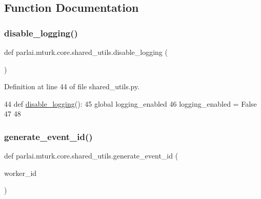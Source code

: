 \subsection{Function Documentation}
\mbox{\label{namespaceparlai_1_1mturk_1_1core_1_1shared__utils_ac9c2cb4e45eb5bb480df0cd8b18c64da}} 
\subsubsection{\texorpdfstring{disable\+\_\+logging()}{disable\_logging()}}
{\footnotesize\ttfamily def parlai.\+mturk.\+core.\+shared\+\_\+utils.\+disable\+\_\+logging (\begin{DoxyParamCaption}{ }\end{DoxyParamCaption})}



Definition at line 44 of file shared\+\_\+utils.\+py.


\begin{DoxyCode}
44 \textcolor{keyword}{def }\hyperlink{namespaceparlai_1_1mturk_1_1core_1_1shared__utils_ac9c2cb4e45eb5bb480df0cd8b18c64da}{disable\_logging}():
45     \textcolor{keyword}{global} logging\_enabled
46     logging\_enabled = \textcolor{keyword}{False}
47 
48 
\end{DoxyCode}
\mbox{\label{namespaceparlai_1_1mturk_1_1core_1_1shared__utils_aba2e4d48063dafc80e931f8925dbb755}} 
\subsubsection{\texorpdfstring{generate\+\_\+event\+\_\+id()}{generate\_event\_id()}}
{\footnotesize\ttfamily def parlai.\+mturk.\+core.\+shared\+\_\+utils.\+generate\+\_\+event\+\_\+id (\begin{DoxyParamCaption}\item[{}]{worker\+\_\+id }\end{DoxyParamCaption})}

